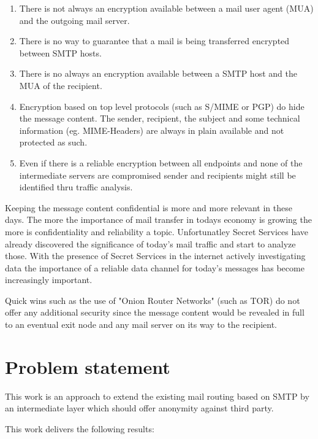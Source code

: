 \documentclass[11pt,a4paper]{book}
\begin{document}
\begin{enumerate}
  \item There is not always an encryption available between a mail user agent (MUA) and the outgoing mail server.
	\item There is no way to guarantee that a mail is being transferred encrypted between SMTP hosts.
	\item There is no always an encryption available between a SMTP host and the MUA of the recipient.
  \item Encryption based on top level protocols (such as S/MIME or PGP) do hide the message content. The sender, recipient, the subject and some technical information (eg. MIME-Headers) are always in plain available and not protected as such.
	\item Even if there is a reliable encryption between all endpoints and none of the intermediate servers are compromised sender and recipients might still be identified thru traffic analysis.
\end{enumerate}

Keeping the message content confidential is more and more relevant in these days. The more the importance of mail transfer in todays economy is growing the more is confidentiality and reliability a topic. Unfortunatley Secret Services have already discovered the significance of today's mail traffic and start to analyze those. With the presence of Secret Services in the internet actively investigating data the importance of a reliable data channel for today's messages has become increasingly important. 

Quick wins such as the use of "Onion Router Networks" (such as TOR) do not offer any additional security since the message content would be revealed in full to an eventual exit node and any mail server on its way to the recipient.

\section{Problem statement}
This work is an approach to extend the existing mail routing based on SMTP by an intermediate
layer which should offer anonymity against third party.\par

This work delivers the following results:
\end{document}
